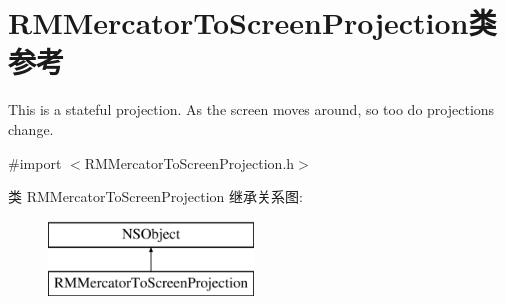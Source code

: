 \hypertarget{interface_r_m_mercator_to_screen_projection}{\section{R\-M\-Mercator\-To\-Screen\-Projection类 参考}
\label{interface_r_m_mercator_to_screen_projection}
}


This is a stateful projection. As the screen moves around, so too do projections change.  




{\ttfamily \#import $<$R\-M\-Mercator\-To\-Screen\-Projection.\-h$>$}

类 R\-M\-Mercator\-To\-Screen\-Projection 继承关系图\-:\begin{figure}[H]
\begin{center}
\leavevmode
\includegraphics[height=2.000000cm]{interface_r_m_mercator_to_screen_projection}
\end{center}
\end{figure}
